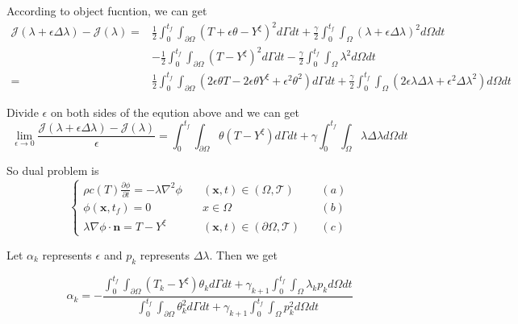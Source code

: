 \documentclass[UTF-8]{article}
\begin{document}
According to object fucntion, we can get
\begin{align}
	\mathcal{J}(\lambda + \epsilon \Delta \lambda) - \mathcal{J}(\lambda) = & \frac{1}{2} \int_{0}^{t_f} \int_{\partial \Omega} \left( T + \epsilon \theta - Y^{\xi} \right)^2 d\Gamma dt + \frac{\gamma}{2} \int_{0}^{t_f} \int_{\Omega} \left( \lambda + \epsilon \Delta \lambda \right)^2 d\Omega dt \nonumber \\
	& - \frac{1}{2} \int_{0}^{t_f}\int_{\partial \Omega} \left( T - Y^\xi \right)^2 d\Gamma dt - \frac{\gamma}{2} \int_{0}^{t_f} \int_{\Omega} \lambda^2 d\Omega dt \nonumber \\
	= & \frac{1}{2} \int_{0}^{t_f}\int_{\partial \Omega} \left( 2\epsilon \theta T - 2\epsilon \theta Y^\xi + \epsilon^2 \theta^2 \right) d\Gamma dt + \frac{\gamma}{2} \int_{0}^{t_f} \int_{\Omega} \left( 2\epsilon \lambda \Delta \lambda + \epsilon^2 \Delta \lambda^2 \right) d\Omega dt
\end{align}

Divide $\epsilon$ on both sides of the eqution above and we can get
\begin{equation}
	\lim_{\epsilon \to 0} \frac{\mathcal{J}(\lambda + \epsilon \Delta \lambda) - \mathcal{J}(\lambda)}{\epsilon} = \int_{0}^{t_f}\int_{\partial \Omega} \theta \left( T - Y^\xi \right) d\Gamma dt + \gamma \int_{0}^{t_f} \int_{\Omega} \lambda \Delta \lambda d\Omega dt
\end{equation}

So dual problem is 
\begin{equation}
	\left\{
	\begin{array}{lll}
		\rho c(T) \frac{\partial \phi}{\partial t} = - \lambda \nabla^2 \phi \quad & (\pmb{x}, t) \in (\Omega, \mathcal{T}) \quad & (a) \\
		\phi(\pmb{x}, t_f) = 0 \quad & x \in \Omega \quad & (b) \\
		\lambda \nabla \phi \cdot \pmb{n} = T - Y^\xi \quad & (\pmb{x}, t) \in (\partial \Omega, \mathcal{T}) \quad & (c)
	\end{array}
	\right.
\end{equation}

Let $\alpha_k$ represents $\epsilon$ and $p_k$ represents $\Delta \lambda$. Then we get

\begin{equation}
	\alpha_k = - \frac{\int_{0}^{t_f} \int_{\partial \Omega} \left( T_k - Y^\xi \right) \theta_k d\Gamma dt + \gamma_{k+1} \int_{0}^{t_f} \int_{\Omega} \lambda_k p_k d\Omega dt}{\int_{0}^{t_f} \int_{\partial \Omega} \theta_k^2 d\Gamma dt + \gamma_{k+1} \int_{0}^{t_f} \int_{\Omega} p_k^2 d\Omega dt}
\end{equation}
\end{document}
